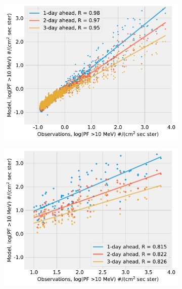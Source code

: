 \begin{figure}[htp]
    \centering
    \begin{subfigure}{0.4\textwidth}
         \centering
         \includegraphics[width=\textwidth]{chapter4/figs/scatterplot_obs_vs_model_valset_3in1_log_PF10.pdf}
    \end{subfigure}
    \begin{subfigure}{0.4\textwidth}
         \centering
         \includegraphics[width=\textwidth]{chapter4/figs/scatterplot_obs_vs_model_valset_3in1_LOG_PF_LT1_log_PF10.pdf}
    \end{subfigure}
    \begin{subfigure}{0.4\textwidth}

\end{subfigure}
\end{figure}
